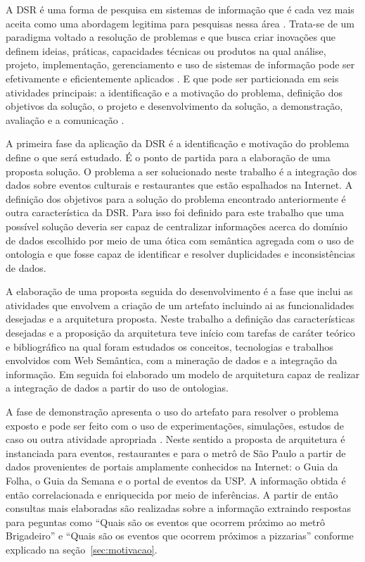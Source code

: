 A DSR é uma forma de pesquisa em sistemas de informação que é cada vez mais aceita como uma abordagem legitima para pesquisas nessa área \citep{Gregor2013}. Trata-se de um paradigma voltado a resolução de problemas e que busca criar inovações que definem ideias, práticas, capacidades técnicas ou produtos na qual análise, projeto, implementação, gerenciamento e uso de sistemas de informação pode ser efetivamente e eficientemente aplicados \citep{Hevner2004}. E que pode ser particionada em seis atividades principais: a identificação e a motivação do problema, definição dos objetivos da solução, o projeto e desenvolvimento da solução, a demonstração, avaliação e a comunicação \citep{Peffers2007}. 

A primeira fase da aplicação da DSR é a identificação e motivação do problema define o que será estudado. É o ponto de partida para a elaboração de uma proposta solução. O problema a ser solucionado neste trabalho é a integração dos dados sobre eventos culturais e restaurantes que estão espalhados na Internet. A definição dos objetivos para a solução do problema encontrado anteriormente é outra característica da DSR. Para isso foi definido para este trabalho que uma possível solução deveria ser capaz de centralizar informações acerca do domínio de dados escolhido por meio de uma ótica com semântica agregada com o uso de ontologia e que fosse capaz de identificar e resolver duplicidades e inconsistências de dados. 

A elaboração de uma proposta seguida do desenvolvimento é a fase que inclui as atividades que envolvem a criação de um artefato incluindo ai as funcionalidades desejadas e a arquitetura proposta. Neste trabalho a definição das características desejadas e a proposição da arquitetura teve início com tarefas de caráter teórico e bibliográfico na qual foram estudados os conceitos, tecnologias e trabalhos envolvidos com Web Semântica, com a mineração de dados e a integração da informação. Em seguida foi elaborado um modelo de arquitetura capaz de realizar a integração de dados a partir do uso de ontologias. 

A fase de demonstração apresenta o uso do artefato para resolver o problema exposto e pode ser feito com o uso de experimentações, simulações, estudos de caso ou outra atividade apropriada \citep{Peffers2007}. Neste sentido a proposta de arquitetura é instanciada para eventos, restaurantes e para o metrô de São Paulo a partir de dados provenientes de portais amplamente conhecidos na Internet: o Guia da Folha, o Guia da Semana e o portal de eventos da USP. A informação obtida é então correlacionada e enriquecida por meio de inferências. A partir de então consultas mais elaboradas são realizadas sobre a informação extraindo respostas para peguntas como ``Quais são os eventos que ocorrem próximo ao metrô Brigadeiro'' e ``Quais são os eventos que ocorrem próximos a pizzarias'' conforme explicado na seção~\ref{sec:motivacao}.

